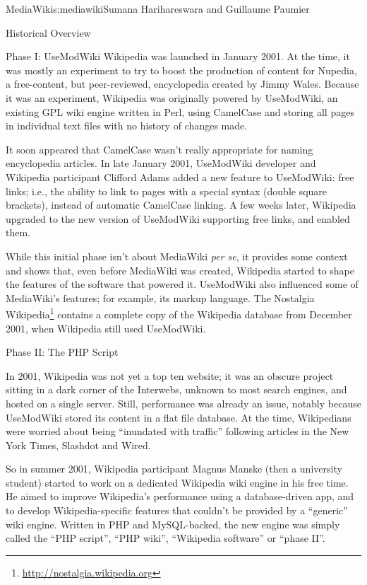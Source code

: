 \begin{aosachapter}{MediaWiki}{s:mediawiki}{Sumana Harihareswara and Guillaume Paumier}
\begin{aosasect1}{Historical Overview}
\begin{aosasect2}{Phase I: UseModWiki}
Wikipedia was launched in January 2001. At the time, it was mostly an
experiment to try to boost the production of content for Nupedia, a
free-content, but peer-reviewed, encyclopedia created by Jimmy
Wales. Because it was an experiment, Wikipedia was originally powered
by UseModWiki, an existing GPL wiki engine written in Perl, using
CamelCase and storing all pages in individual text files with no
history of changes made.

It soon appeared that CamelCase wasn't really appropriate for naming
encyclopedia articles. In late January 2001, UseModWiki developer and
Wikipedia participant Clifford Adams added a new feature to
UseModWiki: free links; i.e., the ability to link to pages with a
special syntax (double square brackets), instead of automatic
CamelCase linking. A few weeks later, Wikipedia upgraded to the new
version of UseModWiki supporting free links, and enabled them.

While this initial phase isn't about MediaWiki \emph{per se}, it
provides some context and shows that, even before MediaWiki was
created, Wikipedia started to shape the features of the software that
powered it. UseModWiki also influenced some of MediaWiki's features;
for example, its markup language. The Nostalgia
Wikipedia\footnote{\url{http://nostalgia.wikipedia.org}} contains a
complete copy of the Wikipedia database from December 2001, when
Wikipedia still used UseModWiki.

\end{aosasect2}

\begin{aosasect2}{Phase II: The PHP Script}

In 2001, Wikipedia was not yet a top ten website; it was an obscure
project sitting in a dark corner of the Interwebs, unknown to most
search engines, and hosted on a single server. Still, performance was
already an issue, notably because UseModWiki stored its content in a
flat file database. At the time, Wikipedians were worried about being
``inundated with traffic'' following articles in the New York Times,
Slashdot and Wired.

So in summer 2001, Wikipedia participant Magnus Manske (then a
university student) started to work on a dedicated Wikipedia wiki
engine in his free time. He aimed to improve Wikipedia's performance
using a database-driven app, and to develop
Wikipedia-specific features that couldn't be provided by a ``generic''
wiki engine. Written in PHP and MySQL-backed, the new engine was
simply called the ``PHP script'', ``PHP wiki'', ``Wikipedia software'' or
``phase II''.


\end{aosasect2}
\end{aosasect1}
\end{aosachapter}
